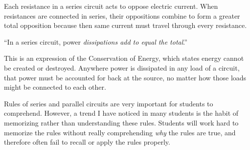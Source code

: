 \vskip 10pt

Each resistance in a series circuit acts to oppose electric current.  When resistances are connected in series, their oppositions combine to form a greater total opposition because then same current must travel through every resistance.



\vskip 30pt

\noindent
``In a series circuit, power {\it dissipations add to equal the total}.''

\vskip 10pt

This is an expression of the Conservation of Energy, which states energy cannot be created or destroyed.  Anywhere power is dissipated in any load of a circuit, that power must be accounted for back at the source, no matter how those loads might be connected to each other.







Rules of series and parallel circuits are very important for students to comprehend.  However, a trend I have noticed in many students is the habit of memorizing rather than understanding these rules.  Students will work hard to memorize the rules without really comprehending {\it why} the rules are true, and therefore often fail to recall or apply the rules properly.





